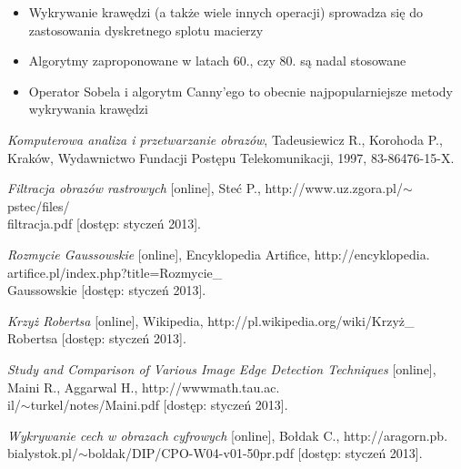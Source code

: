 \documentclass[a4paper,twocolumn,12pt]{article}
\begin{document}
\begin{itemize}
 \item Wykrywanie krawędzi (a także wiele innych operacji) sprowadza się do zastosowania dyskretnego splotu macierzy
 \item Algorytmy zaproponowane w latach 60., czy 80. są nadal stosowane
 \item Operator Sobela i algorytm Canny’ego to obecnie najpopularniejsze metody wykrywania krawędzi
\end{itemize}



\begin{thebibliography}{9}
 \small
 
  \emph{Komputerowa analiza i przetwarzanie obrazów},
  Tadeusiewicz R., Korohoda P.,
  Kraków,
  Wydawnictwo Fundacji Postępu Telekomunikacji,
  1997,
  83-86476-15-X.
 
  \emph{Filtracja obrazów rastrowych} [online],
  Steć P.,
  http://www.uz.zgora.pl/$\sim$pstec/files/\\filtracja.pdf [dostęp: styczeń 2013].
 
  \emph{Rozmycie Gaussowskie} [online],
  Encyklopedia Artifice,
  http://encyklopedia.\\artifice.pl/index.php?title=Rozmycie\_\\Gaussowskie [dostęp: styczeń 2013].
 
  \emph{Krzyż Robertsa} [online],
  Wikipedia,
  http://pl.wikipedia.org/wiki/Krzyż\_\\Robertsa [dostęp: styczeń 2013].
 
  \emph{Study and Comparison of Various Image Edge Detection Techniques} [online],
  Maini R., Aggarwal H.,
  http://wwwmath.tau.ac.\\il/$\sim$turkel/notes/Maini.pdf [dostęp: styczeń 2013].
 
  \emph{Wykrywanie cech w obrazach cyfrowych} [online],
  Bołdak C.,
  http://aragorn.pb.\\bialystok.pl/$\sim$boldak/DIP/CPO-W04-v01-50pr.pdf [dostęp: styczeń 2013].
  
\end{thebibliography}
\end{document}
